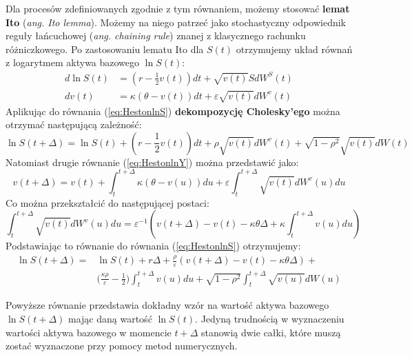 \documentclass{pracamgr}
\begin{document}
Dla procesów zdefiniowanych zgodnie z tym równaniem, możemy 
stosować \textbf{lemat Ito} (\textit{ang. Ito lemma}). Możemy na niego patrzeć 
jako stochastyczny odpowiednik reguły łańcuchowej (\textit{ang. chaining rule}) znanej z 
klasycznego rachunku różniczkowego. 
Po zastosowaniu lematu Ito dla $S(t)$ otrzymujemy układ równań z logarytmem aktywa bazowego $\ln S(t)$:
\begin{subequations}
\begin{align}
d \ln S(t) &= \left( r - \frac{1}{2} v(t) \right) dt 
              + \sqrt{v(t)} SdW^S(t) \label{eq:HestonlnS} \\
dv(t)      &= \kappa (\theta - v(t))dt + \varepsilon 
              \sqrt{v(t)} dW^v(t)  \label{eq:HestonlnY}
\end{align} 
\end{subequations}
Aplikując do równania (\ref{eq:HestonlnS}) \textbf{dekompozycję Cholesky'ego} można
otrzymać następującą zależność:
\begin{equation}
  \ln S(t + \Delta) = \ln S(t) + \left( r - \frac{1}{2} v(t) \right) dt 
              + \rho \sqrt{v(t)} dW^v(t) + \sqrt{1 - \rho^2} \sqrt{v(t)} dW(t)
\end{equation}
Natomiast drugie równanie (\ref{eq:HestonlnY}) można przedstawić jako:
\begin{equation}
  v(t + \Delta)      = v(t) + \int_t^{t+\Delta} \kappa 
                        (\theta - v(u))du + \varepsilon 
                        \int_t^{t+\Delta}  \sqrt{v(t)} dW^v(u) du 
\end{equation}
Co można przekształcić do następującej postaci:
\begin{equation}
  \int_t^{t+\Delta}  \sqrt{v(t)} dW^v(u) du  = \varepsilon^{-1} \left(v(t+\Delta) 
  - v(t) - \kappa \theta \Delta + \kappa \int_t^{t+\Delta}  v(u) du \right)
\end{equation}
Podstawiając to równanie do równania (\ref{eq:HestonlnS}) otrzymujemy:
\begin{equation}
\begin{aligned}
\label{eq:HestonLnSDiscretization}
\ln S(t + \Delta) = & \ln S(t) + r \Delta + \frac{\rho}{\varepsilon} 
(v(t + \Delta)  - v(t) - \kappa \theta \Delta) + \\
& \Big( \frac{\kappa \rho}{\varepsilon} - \frac{1}{2} \Big)
\int_t^{t+\Delta} v(u) du + \sqrt{1-\rho^2} \int_t^{t+\Delta} \sqrt{v(u)}dW(u)
\end{aligned}
\end{equation}

Powyższe równanie przedstawia dokładny wzór na wartość aktywa 
bazowego $\ln S(t + \Delta) $ mając daną wartość $\ln S(t)$.
Jedyną trudnością w wyznaczeniu wartości aktywa bazowego w momencie
$t + \Delta$ stanowią dwie całki, które muszą zostać wyznaczone przy 
pomocy metod numerycznych. 
\end{document}
